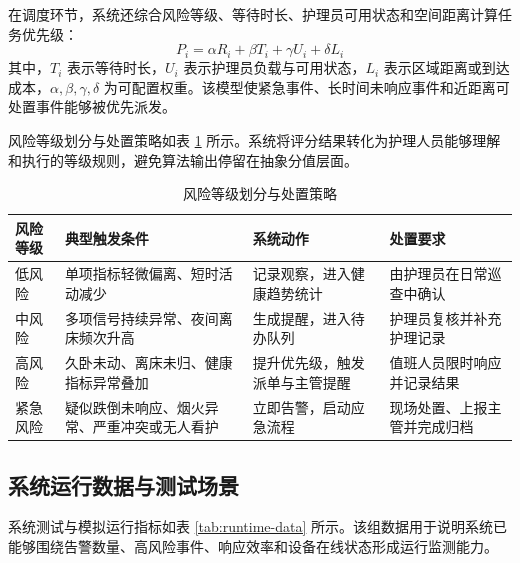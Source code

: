 \documentclass[UTF8,a4paper,zihao=-4,fontset=fandol]{ctexart}
\begin{document}
在调度环节，系统还综合风险等级、等待时长、护理员可用状态和空间距离计算任务优先级：
\begin{equation}
P_i=\alpha R_i+\beta T_i+\gamma U_i+\delta L_i
\label{eq:priority}
\end{equation}
其中，$T_i$ 表示等待时长，$U_i$ 表示护理员负载与可用状态，$L_i$ 表示区域距离或到达成本，$\alpha,\beta,\gamma,\delta$ 为可配置权重。该模型使紧急事件、长时间未响应事件和近距离可处置事件能够被优先派发。

风险等级划分与处置策略如表 \ref{tab:risk-levels} 所示。系统将评分结果转化为护理人员能够理解和执行的等级规则，避免算法输出停留在抽象分值层面。

\begin{table}[htbp]
  \centering
  \caption{风险等级划分与处置策略}
  \label{tab:risk-levels}
  \begin{tabularx}{\textwidth}{>{\centering\arraybackslash}p{2.4cm}>{\centering\arraybackslash}p{3.2cm}>{\centering\arraybackslash}X>{\centering\arraybackslash}p{3.2cm}}
    \toprule
    风险等级 & 典型触发条件 & 系统动作 & 处置要求 \\
    \midrule
    低风险 & 单项指标轻微偏离、短时活动减少 & 记录观察，进入健康趋势统计 & 由护理员在日常巡查中确认 \\
    中风险 & 多项信号持续异常、夜间离床频次升高 & 生成提醒，进入待办队列 & 护理员复核并补充护理记录 \\
    高风险 & 久卧未动、离床未归、健康指标异常叠加 & 提升优先级，触发派单与主管提醒 & 值班人员限时响应并记录结果 \\
    紧急风险 & 疑似跌倒未响应、烟火异常、严重冲突或无人看护 & 立即告警，启动应急流程 & 现场处置、上报主管并完成归档 \\
    \bottomrule
  \end{tabularx}
\end{table}

\subsection{系统运行数据与测试场景}

系统测试与模拟运行指标如表 \ref{tab:runtime-data} 所示。该组数据用于说明系统已能够围绕告警数量、高风险事件、响应效率和设备在线状态形成运行监测能力。
\end{document}
